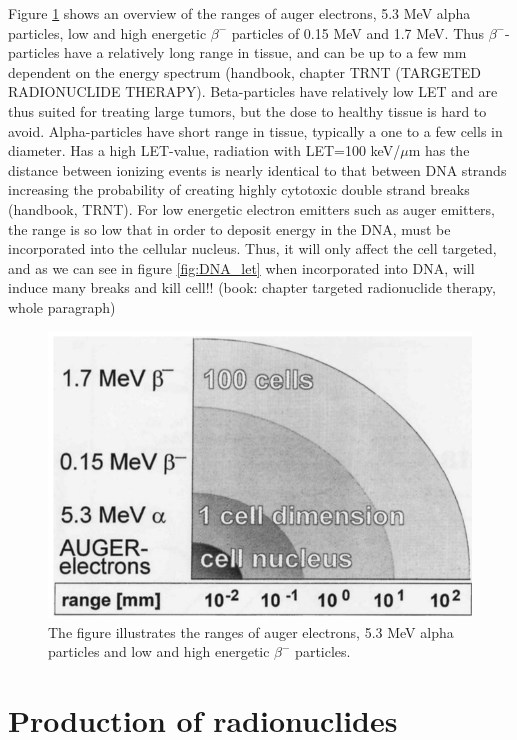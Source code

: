 \documentclass[a4paper,11pt,twoside]{book}
\begin{document}
Figure \ref{fig:cell_dimension} shows an overview of the ranges of auger electrons, 5.3 MeV alpha particles, low and high energetic $\beta^-$ particles of 0.15 MeV and 1.7 MeV. Thus $\beta^-$-particles have a relatively long range in tissue, and can be up to a few mm dependent on the energy spectrum (handbook, chapter TRNT (TARGETED RADIONUCLIDE THERAPY). Beta-particles have relatively low LET and are thus suited for treating large tumors, but the dose to healthy tissue is hard to avoid.  Alpha-particles have short range in tissue, typically a one to a few cells in diameter. Has a high LET-value, radiation with LET=100 keV/$\mu$m has the distance between ionizing events is nearly identical to that between DNA strands increasing the probability of creating highly cytotoxic double strand breaks (handbook, TRNT). For low energetic electron emitters such as auger emitters, the range is so low that in order to deposit energy in the DNA, must be incorporated into the cellular nucleus. Thus, it will only affect the cell targeted, and as we can see in figure \ref{fig:DNA_let} when incorporated into DNA, will induce many breaks and kill cell!!  (book: chapter targeted radionuclide therapy, whole paragraph) \\

\begin{figure}
    \centering
    \includegraphics{Theory/cell_dimension.png}
    \caption{The figure illustrates the ranges of auger electrons, 5.3 MeV alpha particles and low and high energetic $\beta^-$ particles. }
    \label{fig:cell_dimension}
\end{figure}




\section{Production of radionuclides}
\end{document}
